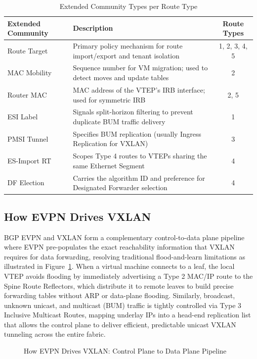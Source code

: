 \begin{table}[!htbp]
\small
\centering
\begin{tabularx}{\textwidth}{@{}l X c @{}}
\toprule
\textbf{Extended Community} & \textbf{Description} & \textbf{Route Types} \\ \midrule
Route Target & Primary policy mechanism for route import/export and tenant isolation & 1, 2, 3, 4, 5 \\ \midrule
MAC Mobility & Sequence number for VM migration; used to detect moves and update tables & 2 \\ \midrule
Router MAC & MAC address of the VTEP's IRB interface; used for symmetric IRB & 2, 5 \\ \midrule
ESI Label & Signals split-horizon filtering to prevent duplicate BUM traffic delivery & 1 \\ \midrule
PMSI Tunnel & Specifies BUM replication (usually Ingress Replication for VXLAN) & 3 \\ \midrule
ES-Import RT & Scopes Type 4 routes to VTEPs sharing the same Ethernet Segment & 4 \\ \midrule
DF Election & Carries the algorithm ID and preference for Designated Forwarder selection & 4 \\ \bottomrule
\end{tabularx}
\caption{Extended Community Types per Route Type}
\label{tab:extended-communities}
\end{table}

\subsection{How EVPN Drives VXLAN}
BGP EVPN and VXLAN form a complementary control-to-data plane pipeline where EVPN pre-populates the exact reachability information that VXLAN requires for data forwarding, resolving traditional flood-and-learn limitations as illustrated in Figure~\ref{fig:EvpnDrivesVXLan}. When a virtual machine connects to a leaf, the local VTEP avoids flooding by immediately advertising a Type 2 MAC/IP route to the Spine Route Reflectors, which distribute it to remote leaves to build precise forwarding tables without ARP or data-plane flooding. Similarly, broadcast, unknown unicast, and multicast (BUM) traffic is tightly controlled via Type 3 Inclusive Multicast Routes, mapping underlay IPs into a head-end replication list that allows the control plane to deliver efficient, predictable unicast VXLAN tunneling across the entire fabric.

\begin{figure}[!htbp]
        \centering
        \EvpnDrivesVXLan
        \caption{How EVPN Drives VXLAN: Control Plane to Data Plane Pipeline}
        \label{fig:EvpnDrivesVXLan}
\end{figure}

